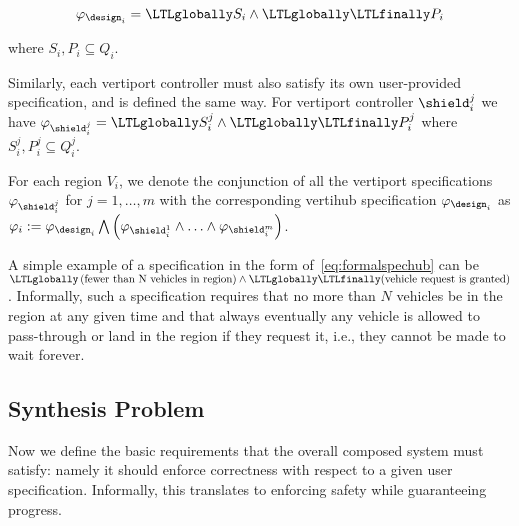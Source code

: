 \begin{equation}\label{eq:formalspechub}
    \varphi_{\design_i} = \LTLglobally S_i \wedge \LTLglobally \LTLfinally P_i
\end{equation}

\noindent where $S_i, P_i \subseteq Q_i$. 

Similarly, each vertiport controller must also satisfy its own user-provided specification, and is defined the same way. For vertiport controller $\shield^j_i$ we have $\varphi_{\shield^{j}_i} = \LTLglobally S_{i}^j \wedge \LTLglobally \LTLfinally P_{i}^j$ where $S_{i}^j, P_{i}^j \subseteq Q_i^j$. 

For each region $V_i$, we denote the conjunction of all the vertiport specifications $\varphi_{\shield^{j}_i}$ for $j=1,\ldots,m$ with the corresponding vertihub specification $\varphi_{\design_i}$ as $\varphi_i := \varphi_{\design_i} \bigwedge \left( \varphi_{\shield^{1}_i} \wedge \ldots \wedge 
\varphi_{\shield^{m}_i}\right)$. 

\begin{eg}
A simple example of a specification in the form of~\eqref{eq:formalspechub} can be $\LTLglobally \left(\text{fewer than N vehicles in region} \right) \wedge \LTLglobally\LTLfinally (\text{vehicle request is granted})$. Informally, such a specification requires that no more than $N$ vehicles be in the region at any given time and that always eventually any vehicle is allowed to pass-through or land in the region if they request it, i.e., they cannot be made to wait forever. 
\end{eg}


\subsection{Synthesis Problem}\label{sec_correctness}

Now we define the basic  requirements that the overall composed system must satisfy: namely it should enforce correctness with respect to a given user specification.
Informally, this translates to enforcing safety while guaranteeing progress. 


